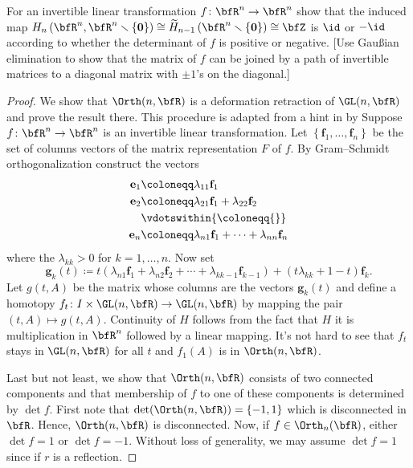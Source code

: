 \begin{problem}[Hatcher {\S}2.2, Ex.\@ 7]
For an invertible linear transformation $f\colon\bfR^n\to\bfR^n$ show that
the induced map
$H_n\left(\bfR^n,\bfR^n\smallsetminus\{\mathbf{0}\}\right)\cong\widetilde
H_{n-1}\left(\bfR^n\smallsetminus\{\mathbf{0}\}\right)\cong\bfZ$ is $\id$ or $-\id$
according to whether the determinant of $f$ is positive or negative. [Use
Gaußian elimination to show that the matrix of $f$ can be joined by a path
of invertible matrices to a diagonal matrix with $\pm 1$'s on the
diagonal.]
\end{problem}
\begin{proof}
We show that $\Orth(n,\bfR)$ is a deformation retraction of $\GL(n,\bfR)$
and prove the result there. This procedure is adapted from a hint in
\emph{} by  Suppose $f\colon\bfR^n\to\bfR^n$ is
an invertible linear transformation. Let
$\left\{\mathbf{f}_1,\dotsc,\mathbf{f}_n\right\}$ be the set of columns
vectors of the matrix representation $F$ of $f$. By Gram--Schmidt
orthogonalization construct the vectors
\begin{equation}
\label{eq:gram-schmidt-orth}
\begin{aligned}
\mathbf{e}_1&\coloneqq\lambda_{11}\mathbf{f}_1\\
\mathbf{e}_2&\coloneqq\lambda_{21}\mathbf{f}_1+\lambda_{22}\mathbf{f}_2\\
&\vdotswithin{{}\coloneqq{}}\\
\mathbf{e}_n&\coloneqq\lambda_{n1}\mathbf{f}_1+\dotsb+\lambda_{nn}\mathbf{f}_n
\end{aligned}
\end{equation}
where the $\lambda_{kk}>0$ for $k=1,\dotsc,n$. Now set
\begin{equation}
\label{eq:vectors-as-function-of-t}
\mathbf{g}_k(t)\coloneqq
t\left(\lambda_{n1}\mathbf{f}_1+\lambda_{n2}\mathbf{f}_2+\dotsb+\lambda_{kk-1}\mathbf{f}_{k-1}\right)+(t\lambda_{kk}+1-t)\mathbf{f}_k.
\end{equation}
Let $g(t,A)$ be the matrix whose columns are the vectors $\mathbf{g}_k(t)$
and define a homotopy $f_t\colon I\times\GL(n,\bfR)\to\GL(n,\bfR)$ by mapping
the pair $(t,A)\mapsto g(t,A)$. Continuity of $H$ follows from the fact
that $H$ it is multiplication in $\bfR^n$ followed by a linear
mapping. It's not hard to see that $f_t$ stays in $\GL(n,\bfR)$ for all $t$
and $f_1(A)$ is in $\Orth(n,\bfR)$.

Last but not least, we show that $\Orth(n,\bfR)$ consists of two connected
components and that membership of $f$ to one of these components is
determined by $\det f$. First note that
$\det(\Orth(n,\bfR))=\{-1,1\}$ which is disconnected in
$\bfR$. Hence, $\Orth(n,\bfR)$ is disconnected. Now, if
$f\in\Orth_n(\bfR)$, either $\det f=1$ or $\det f=-1$. Without loss of
generality, we may assume $\det f=1$ since if $r$ is a reflection.


\end{proof}
